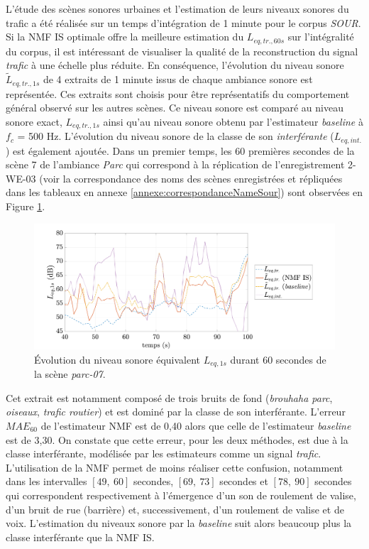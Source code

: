 L'étude des scènes sonores urbaines et l'estimation de leurs niveaux sonores du trafic a été réalisée sur un temps d'intégration de 1 minute pour le corpus \textit{SOUR}. 
Si la NMF IS optimale offre la meilleure estimation du $L_{eq,tr.,60s}$ sur l'intégralité du corpus, il est intéressant de visualiser la qualité de la reconstruction du signal \textit{trafic} à une échelle plus réduite. En conséquence, l'évolution du niveau sonore $\tilde{L}_{eq,tr.,1s}$ de 4 extraits de 1 minute issus de chaque ambiance sonore est représentée. Ces extraits sont choisis pour être représentatifs du comportement général observé sur les autres scènes. Ce niveau sonore est comparé au niveau sonore exact, $L_{eq,tr.,1s}$ ainsi qu'au niveau sonore obtenu par l'estimateur \textit{baseline} à $f_c$ = 500 Hz. L'évolution du niveau sonore de la classe de son \textit{interférante} ($L_{eq,int.}$) est également ajoutée. 
Dans un premier temps, les 60 premières secondes de la scène 7 de l'ambiance \textit{Parc} qui correspond à la réplication de l'enregistrement 2-WE-03 (voir la correspondance des noms des scènes enregistrées et répliquées dans les tableaux en annexe \ref{annexe:correspondanceNameSour}) sont observées en Figure \ref{fig:Lp_parc}.


\begin{figure}[h!]
\centering
\includegraphics[width=.8\linewidth]{./figures/NMF/Lp_park_7.pdf} 
\caption{Évolution du niveau sonore équivalent $L_{eq, 1s}$ durant 60 secondes de la scène \textit{parc-07}.} 
\label{fig:Lp_parc}
\end{figure}

Cet extrait est notamment composé de trois bruits de fond (\textit{brouhaha parc}, \textit{oiseaux}, \textit{trafic routier}) et est dominé par la classe de son interférante. 
L'erreur $MAE_{60}$ de l'estimateur NMF est de 0,40 alors que celle de l'estimateur \textit{baseline} est de 3,30. 
On constate que cette erreur, pour les deux méthodes, est due à la classe interférante, modélisée par les estimateurs comme un signal \textit{trafic}. L'utilisation de la NMF permet de moins réaliser cette confusion, notamment dans les intervalles $\left[ 49,~60 \right]$ secondes, $\left[ 69,~73 \right]$ secondes et $\left[ 78,~90 \right]$ secondes qui correspondent respectivement à l'émergence d'un son de roulement de valise, d'un bruit de rue (barrière) et, successivement, d'un roulement de valise et de voix. L'estimation du niveaux sonore par la \textit{baseline} suit alors beaucoup plus la classe interférante que la NMF IS. 

